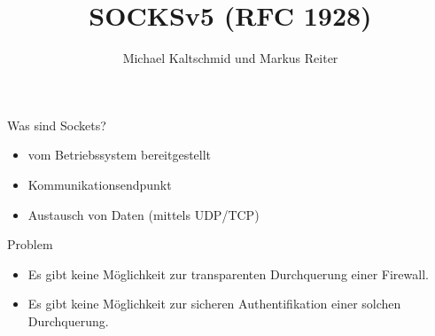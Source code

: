 \documentclass[t]{beamer}
\title{SOCKSv5 (RFC 1928)}
\author{Michael Kaltschmid und Markus Reiter}
\date{\printdate{2017-06-13}}
\begin{document}
  \RaggedRight

  \maketitle

  \begin{frame}{Was sind Sockets?}
    \begin{itemize}
      \item vom Betriebssystem bereitgestellt
      \item Kommunikationsendpunkt
      \item Austausch von Daten (mittels UDP/TCP)
    \end{itemize}
  \end{frame}

  \begin{frame}{Problem}
    \begin{itemize}
      \item Es gibt keine Möglichkeit zur transparenten Durchquerung einer Firewall.
      \item Es gibt keine Möglichkeit zur sicheren Authentifikation einer solchen Durchquerung.
    \end{itemize}
  \end{frame}
\end{document}
